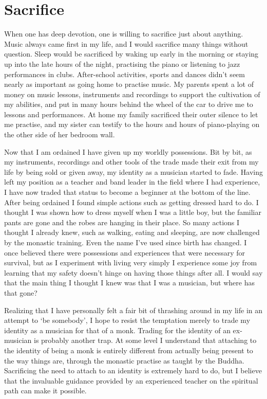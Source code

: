 \section{Sacrifice}

When one has deep devotion, one is willing to sacrifice just about
anything. Music always came first in my life, and I would sacrifice many
things without question. Sleep would be sacrificed by waking up early in
the morning or staying up into the late hours of the night, practising
the piano or listening to jazz performances in clubs. After-school
activities, sports and dances didn't seem nearly as important as going
home to practise music. My parents spent a lot of money on music
lessons, instruments and recordings to support the cultivation of my
abilities, and put in many hours behind the wheel of the car to drive me
to lessons and performances. At home my family sacrificed their outer
silence to let me practise, and my sister can testify to the hours and
hours of piano-playing on the other side of her bedroom wall. 

Now that I am ordained I have given up my worldly possessions. Bit by
bit, as my instruments, recordings and other tools of the trade made
their exit from my life by being sold or given away, my identity as a
musician started to fade. Having left my position as a teacher and
band leader in the field where I had experience, I have now traded that
status to become a beginner at the bottom of the line. After being
ordained I found simple actions such as getting dressed hard to do. I
thought I was shown how to dress myself when I was a little boy, but the
familiar pants are gone and the robes are hanging in their place. So
many actions I thought I already knew, such as walking, eating and
sleeping, are now challenged by the monastic training. Even the name
I've used since birth has changed. I once believed there were
possessions and experiences that were necessary for survival, but as I
experiment with living very simply I experience some joy from learning
that my safety doesn't hinge on having those things after all. I would
say that the main thing I thought I knew was that I was a musician, but
where has that gone? 

Realizing that I have personally felt a fair bit of thrashing around in
my life in an attempt to `be somebody', I hope to resist the temptation
merely to trade my identity as a musician for that of a monk. Trading
for the identity of an ex-musician is probably another trap. At some
level I understand that attaching to the identity of being a monk is
entirely different from actually being present to the way things are, 
through the monastic practise as taught by the Buddha. Sacrificing the
need to attach to an identity is extremely hard to do, but I believe
that the invaluable guidance provided by an experienced teacher on the
spiritual path can make it possible. 

